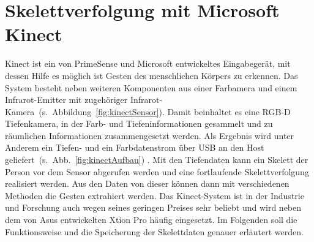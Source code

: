 \section{Skelettverfolgung mit Microsoft Kinect}\label{Tracking}
Kinect ist ein von PrimeSense und Microsoft entwickeltes Eingabegerät, mit dessen Hilfe es möglich ist Gesten des menschlichen Körpers zu erkennen. Das System besteht neben weiteren Komponenten aus einer Farbamera und einem Infrarot-Emitter mit zugehöriger Infrarot-Kamera~(s.~Abbildung~\ref{fig:kinectSensor}). Damit beinhaltet es eine RGB-D Tiefenkamera, in der Farb- und Tiefeninformationen gesammelt und zu räumlichen Informationen zusammengesetzt werden. Als Ergebnis wird unter Anderem ein Tiefen- und ein Farbdatenstrom über USB an den Host geliefert~(s.~Abb.~\ref{fig:kinectAufbau}) \cite{hannaKinect1}. Mit den Tiefendaten kann ein Skelett der Person vor dem Sensor abgerufen werden und eine fortlaufende Skelettverfolgung realisiert werden. Aus den Daten von dieser können dann mit verschiedenen Methoden die Gesten extrahiert werden. Das Kinect-System ist in der Industrie und Forschung auch wegen seines geringen Preises sehr beliebt und wird neben dem von Asus entwickelten Xtion Pro häufig eingesetzt. Im Folgenden soll die Funktionsweise und die Speicherung der Skelettdaten genauer erläutert werden.~\cite{cruzkinect}

